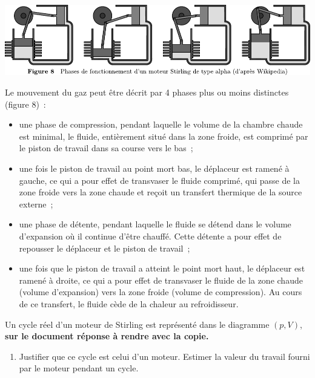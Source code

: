 \documentclass[a4paper, 12pt, garamond]{book}
\begin{document}
\begin{center}

	\includegraphics[scale=1]{figures/pb-stirling-fig8.pdf}

\end{center}

Le mouvement du gaz peut être décrit par 4 phases plus ou moins
distinctes (figure 8)~:

\begin{itemize}
	\item
	      une phase de compression, pendant laquelle le volume de la chambre
	      chaude est minimal, le fluide, entièrement situé dans la zone froide,
	      est comprimé par le piston de travail dans sa course vers le bas~;
	\item
	      une fois le piston de travail au point mort bas, le déplaceur est
	      ramené à gauche, ce qui a pour effet de transvaser le fluide comprimé,
	      qui passe de la zone froide vers la zone chaude et reçoit un transfert
	      thermique de la source externe~;
	\item
	      une phase de détente, pendant laquelle le fluide se détend dans le
	      volume d'expansion où il continue d'être chauffé. Cette détente a pour
	      effet de repousser le déplaceur et le piston de travail~;
	\item
	      une fois que le piston de travail a atteint le point mort haut, le
	      déplaceur est ramené à droite, ce qui a pour effet de transvaser le
	      fluide de la zone chaude (volume d'expansion) vers la zone froide
	      (volume de compression). Au cours de ce transfert, le fluide cède de
	      la chaleur au refroidisseur.
\end{itemize}

Un cycle réel d'un moteur de Stirling est représenté dans le diagramme
\((p,V)\), \textbf{sur le document réponse à rendre avec la copie.}

\begin{enumerate}
	\item
	      Justifier que ce cycle est celui d'un moteur. Estimer la valeur du
	      travail fourni par le moteur pendant un cycle.
\end{enumerate}
\end{document}
